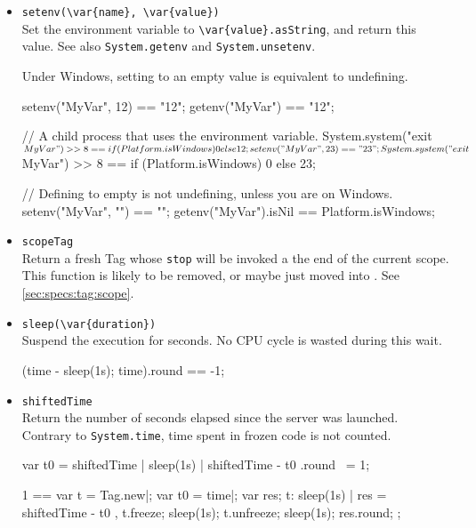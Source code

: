 \begin{itemize}
\item \lstinline|setenv(\var{name}, \var{value})|\\
  Set the environment variable  to
  \lstinline|\var{value}.asString|, and return this value.  See also
  \lstinline|System.getenv| and \lstinline|System.unsetenv|.
  \begin{windows}
    Under Windows, setting to an empty value is equivalent to
    undefining.
  \end{windows}

\begin{urbiassert}
setenv("MyVar", 12) == "12";
getenv("MyVar") == "12";

// A child process that uses the environment variable.
System.system("exit $MyVar") >> 8 ==
       {if (Platform.isWindows) 0 else 12};
setenv("MyVar", 23) == "23";
System.system("exit $MyVar") >> 8 ==
       {if (Platform.isWindows) 0 else 23};

// Defining to empty is not undefining, unless you are on Windows.
setenv("MyVar", "") == "";
getenv("MyVar").isNil == Platform.isWindows;
\end{urbiassert}

\item \lstinline|scopeTag|\\
  Return a fresh Tag whose \lstinline|stop| will be invoked a the end
  of the current scope.  This function is likely to be removed, or
  maybe just moved into .  See
  \autoref{sec:specs:tag:scope}.

\item \lstinline|sleep(\var{duration})|\\
  Suspend the execution for  seconds.  No CPU cycle is
  wasted during this wait.

\begin{urbiassert}
(time - {sleep(1s); time}).round == -1;
\end{urbiassert}

\item \lstinline|shiftedTime|\\
  Return the number of seconds elapsed since the \urbi server was
  launched.  Contrary to \lstinline|System.time|, time spent in frozen
  code is not counted.
\begin{urbiassert}
{ var t0 = shiftedTime | sleep(1s) | shiftedTime - t0 }.round ~= 1;

  1 ==
  {
    var t = Tag.new|;
    var t0 = time|;
    var res;
    t: { sleep(1s) | res = shiftedTime - t0 },
    t.freeze;
    sleep(1s);
    t.unfreeze;
    sleep(1s);
    res.round;
  };
\end{urbiassert}


\end{itemize}
